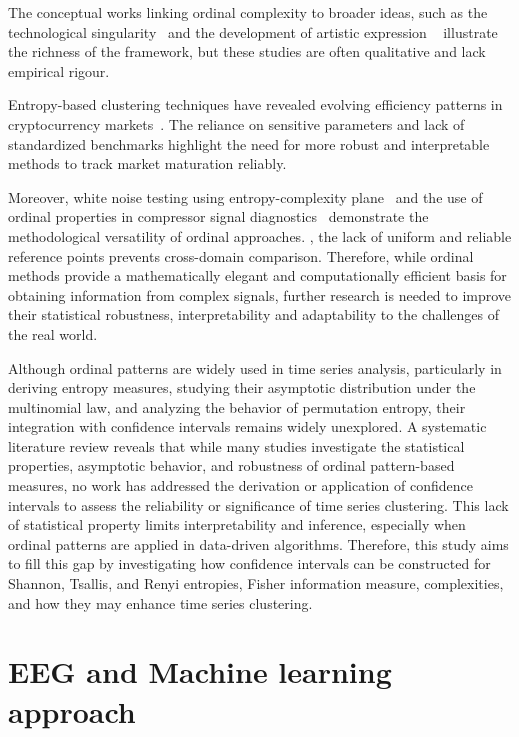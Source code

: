 The conceptual works linking ordinal complexity to broader ideas, such as the technological singularity~\cite{Modis2022} and the development of artistic expression ~\cite{Sigaki2018} illustrate the richness of the framework, but these studies are often qualitative and lack empirical rigour. 

Entropy-based clustering techniques have revealed evolving efficiency patterns in cryptocurrency markets~\cite{Sigaki2019}. The reliance on sensitive parameters and lack of standardized benchmarks highlight the need for more robust and interpretable methods to track market maturation reliably.

Moreover, white noise testing using entropy-complexity plane~\cite{Chagas2022a} and the use of ordinal properties in compressor signal diagnostics~\cite{Barbosa2024} demonstrate the methodological versatility of ordinal approaches. , the lack of uniform and reliable reference points prevents cross-domain comparison. Therefore, while ordinal methods provide a mathematically elegant and computationally efficient basis for obtaining information from complex signals, further research is needed to improve their statistical robustness, interpretability and adaptability to the challenges of the real world.

Although ordinal patterns are widely used in time series analysis, particularly in deriving entropy measures, studying their asymptotic distribution under the multinomial law, and analyzing the behavior of permutation entropy, their integration with confidence intervals remains widely unexplored. A systematic literature review reveals that while many studies investigate the statistical properties, asymptotic behavior, and robustness of ordinal pattern-based measures, no work has addressed the derivation or application of confidence intervals to assess the reliability or significance of time series clustering. This lack of statistical property limits interpretability and inference, especially when ordinal patterns are applied in data-driven algorithms. Therefore, this study aims to fill this gap by investigating how confidence intervals can be constructed for Shannon, Tsallis, and Renyi entropies, Fisher information measure, complexities, and how they may enhance time series clustering.

\section{EEG and Machine learning approach}\label{Sec:ReviewTopicEEG}

